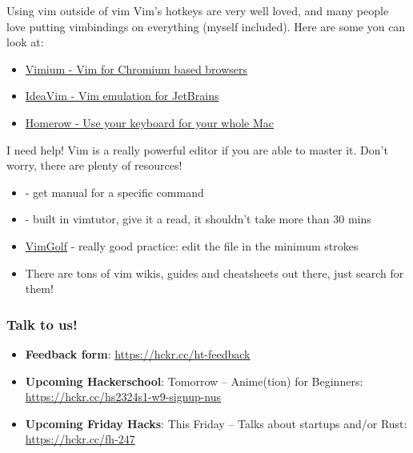 \documentclass[12pt]{beamer}
\begin{document}
\begin{frame}{Using vim outside of vim}
    Vim's hotkeys are very well loved, and many people love putting vimbindings on everything (myself included).
    Here are some you can look at:

    \begin{itemize}
        \item \href{https://chrome.google.com/webstore/detail/vimium/dbepggeogbaibhgnhhndojpepiihcmeb?hl=en}{Vimium - Vim for Chromium based browsers}
        \item \href{https://plugins.jetbrains.com/plugin/164-ideavim}{IdeaVim - Vim emulation for JetBrains}
        \item \href{https://www.homerow.app}{Homerow - Use your keyboard for your whole Mac}
    \end{itemize}{}
\end{frame}{}

\begin{frame}{I need help!}
    Vim is a really powerful editor if you are able to master it. Don't worry, there are plenty of resources!
    \begin{itemize}
        \item {} - get manual for a specific command
        \item {} - built in vimtutor, give it a read, it shouldn't take more than 30 mins
        \item \href{https://www.vimgolf.com}{VimGolf} - really good practice: edit the file in the minimum strokes
        \item There are tons of vim wikis, guides and cheatsheets out there, just search for them!
    \end{itemize}{}
\end{frame}{}

\begin{frame}
    \frametitle{Talk to us!}
    \begin{itemize}
        \item \textbf{Feedback form}: \url{https://hckr.cc/ht-feedback}

        \item \textbf{Upcoming Hackerschool}:
              Tomorrow -- Anime(tion) for Beginners: \url{https://hckr.cc/hs2324s1-w9-signup-nus}

        \item \textbf{Upcoming Friday Hacks}:
              This Friday -- Talks about startups and/or Rust: \url{https://hckr.cc/fh-247}
    \end{itemize}
\end{frame}
\end{document}
